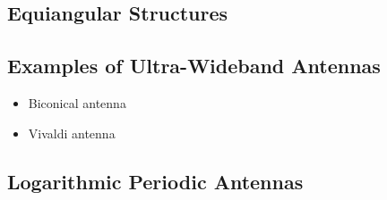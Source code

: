 \subsection{Equiangular Structures}
\subsection{Examples of Ultra-Wideband Antennas}
\begin{itemize}
    \itemsep0pt
    \item Biconical antenna
    \item Vivaldi antenna
\end{itemize}

\subsection{Logarithmic Periodic Antennas}
